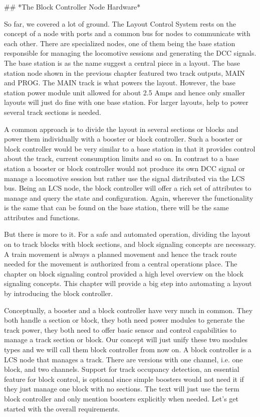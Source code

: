 ## *The Block Controller Node Hardware*

So far, we covered a lot of ground. The Layout Control System rests on the concept of a node with ports and a common bus for nodes to communicate with each other. There are specialized nodes, one of them being the base station responsible for managing the locomotive sessions and generating the DCC signals. The base station is as the name suggest a central piece in a layout. The base station node shown in the previous chapter featured two track outputs, MAIN and PROG. The MAIN track is what powers the layout. However, the base station power module unit allowed for about 2.5 Amps and hence only smaller layouts will just do fine with one base station. For larger layouts, help to power several track sections is needed.

A common approach is to divide the layout in several sections or blocks and power them individually with a booster or block controller. Such a booster or block controller would be very similar to a base station in that it provides control about the track, current consumption limits and so on. In contrast to a base station a booster or block controller would not produce its own DCC signal or manage a locomotive session but rather use the signal distributed via the LCS bus. Being an LCS node, the block controller will offer a rich set of attributes to manage and query the state and configuration. Again, wherever the functionality is the same that can be found on the base station, there will be the same attributes and functions.

But there is more to it. For a safe and automated operation, dividing the layout on to track blocks with block sections, and block signaling concepts are necessary. A train movement is always a planned movement and hence the track route needed for the movement is authorized from a central operations place. The chapter on block signaling control provided a high level overview on the block signaling concepts. This chapter will provide a big step into automating a layout by introducing the block controller.

Conceptually, a booster and a block controller have very much in common. They both handle a section or block, they both need power modules to generate the track power, they both need to offer basic sensor and control capabilities to manage a track section or block. Our concept will just unify these two modules types and we will call them block controller from now on. A block controller is a LCS node that manages a track. There are versions with one channel, i.e. one block, and two channels. Support for track occupancy detection, an essential feature for block control, is optional since simple boosters would not need it if they just manage one block with no sections. The text will just use the term block controller and only mention boosters explicitly when needed. Let's get started with the overall requirements.

